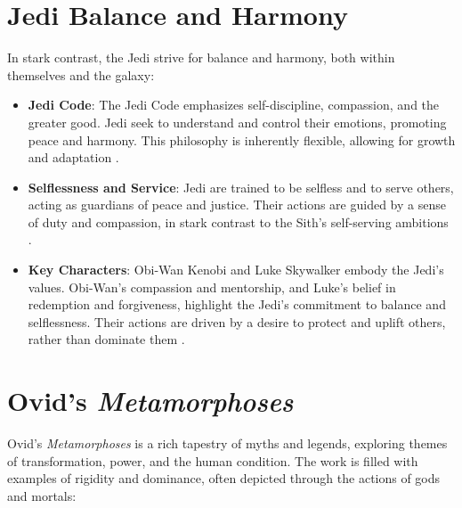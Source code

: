 \documentclass{article}
\begin{document}
\section*{Jedi Balance and Harmony}

In stark contrast, the Jedi strive for balance and harmony, both within themselves and the galaxy:

\begin{itemize}
    \item \textbf{Jedi Code}: The Jedi Code emphasizes self-discipline, compassion, and the greater good. Jedi seek to understand and control their emotions, promoting peace and harmony. This philosophy is inherently flexible, allowing for growth and adaptation \cite{serter2021light}.
    \item \textbf{Selflessness and Service}: Jedi are trained to be selfless and to serve others, acting as guardians of peace and justice. Their actions are guided by a sense of duty and compassion, in stark contrast to the Sith's self-serving ambitions \cite{forbes1999battling}.
    \item \textbf{Key Characters}: Obi-Wan Kenobi and Luke Skywalker embody the Jedi's values. Obi-Wan's compassion and mentorship, and Luke's belief in redemption and forgiveness, highlight the Jedi's commitment to balance and selflessness. Their actions are driven by a desire to protect and uplift others, rather than dominate them \cite{springer2019star}.
\end{itemize}

\section*{Ovid's \textit{Metamorphoses}}

Ovid's \textit{Metamorphoses} is a rich tapestry of myths and legends, exploring themes of transformation, power, and the human condition. The work is filled with examples of rigidity and dominance, often depicted through the actions of gods and mortals:
\end{document}
